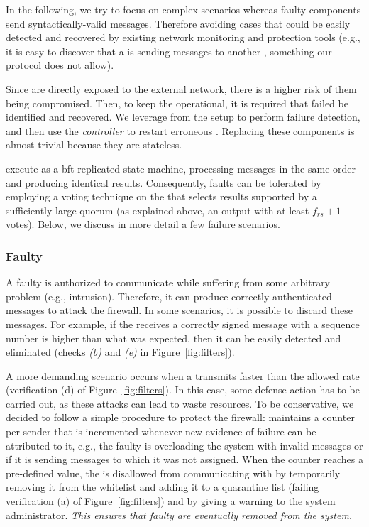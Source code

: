 In the following, we try to focus on complex scenarios whereas faulty components send syntactically-valid messages. 
Therefore avoiding cases that could be easily detected and recovered by existing network monitoring and protection tools (e.g., it is easy to discover that a \presieve is sending messages to another \presieve, something our protocol does not allow).

Since \presieves are directly exposed to the external network, there is a higher risk of them being compromised.
Then, to keep the \sieveq operational, it is required that failed \presieves be identified and recovered.
We leverage from the \repsieve setup to perform failure detection, and then use the \emph{controller} to restart erroneous \presieves.
Replacing these components is almost trivial because they are stateless.

\Repsieves execute as a \gls{bft} replicated state machine, processing messages in the same order and producing identical results.
Consequently, \repsieves faults can be tolerated by employing a voting technique on the \postsieve that selects results supported by a sufficiently large quorum (as explained above, an output with at least $f_{rs} + 1$ votes).
Below, we discuss in more detail a few failure scenarios.



\subsubsection{Faulty \Sender}
A faulty \sender is authorized to communicate while suffering from some arbitrary problem (e.g., intrusion). 
Therefore, it can produce correctly authenticated messages to attack the firewall. 
In some scenarios, it is possible to discard these messages. 
For example, if the \sieveq receives a correctly signed message with a sequence number is higher than what was expected, then it can be easily detected and eliminated (checks \emph{(b)} and \emph{(e)} in Figure~\ref{fig:filters}).

A more demanding scenario occurs when a \sender transmits faster than the allowed rate (verification (d) of Figure~\ref{fig:filters}).
In this case, some defense action has to be carried out, as these attacks can lead \sieveq to waste resources.
To be conservative, we decided to follow a simple procedure to protect the firewall: \sieveq maintains a counter per sender that is incremented whenever new evidence of failure can be attributed to it, e.g., the faulty \sender is overloading the system with invalid messages or if it is sending messages to \presieves which it was not assigned.
When the counter reaches a pre-defined value, the \sender is disallowed from communicating with \sieveq by temporarily removing it from the whitelist and adding it to a quarantine list (failing verification (a) of Figure~\ref{fig:filters}) and by giving a warning to the system administrator.
\emph{This ensures that faulty \emph{\senders} are eventually removed from the system.}

